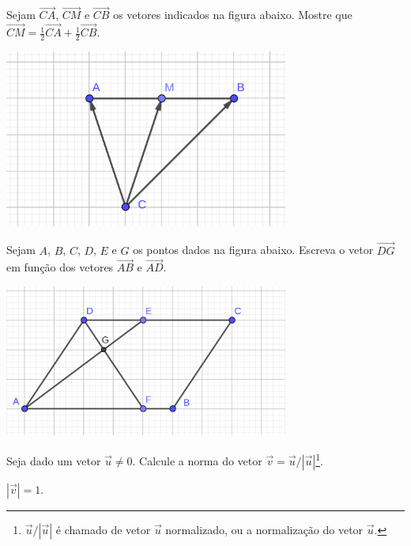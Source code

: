 \begin{exer}\label{exer:vetor_prob_02}
  Sejam $\overrightarrow{CA}$, $\overrightarrow{CM}$ e $\overrightarrow{CB}$ os vetores indicados na figura abaixo. Mostre que $\overrightarrow{CM} = \frac{1}{2}\overrightarrow{CA} + \frac{1}{2}\overrightarrow{CB}$.

  \includegraphics[width=0.7\textwidth]{./cap_vetor/dados/fig_exer_prob_02/fig_exer_prob_02}
\end{exer}

\begin{exer}\label{exer:vetor_prob_03}
  Sejam $A$, $B$, $C$, $D$, $E$ e $G$ os pontos dados na figura abaixo. Escreva o vetor $\overrightarrow{DG}$ em função dos vetores $\overrightarrow{AB}$ e $\overrightarrow{AD}$.

  \includegraphics[width=0.7\textwidth]{./cap_vetor/dados/fig_exer_prob_03/fig_exer_prob_03}
\end{exer}

\begin{exer}
  Seja dado um vetor $\vec{u}\neq 0$. Calcule a norma do vetor $\vec{v}=\vec{u}/|\vec{u}|$\footnote{$\vec{u}/|\vec{u}|$ é chamado de vetor $\vec{u}$ normalizado, ou a normalização do vetor $\vec{u}$.}.
\end{exer}
\begin{resp}
  $|\vec{v}|=1$.
\end{resp}
